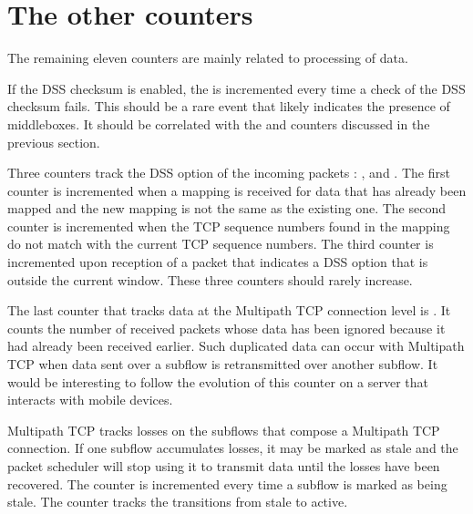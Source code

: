 \documentclass[letterpaper,10pt,english]{sphinxmanual}
\begin{document}
\section{The other counters}
\label{\detokenize{nstat-mptcp:the-other-counters}}
\sphinxAtStartPar
The remaining eleven counters are mainly related to processing of data.

\sphinxAtStartPar
If the DSS checksum is enabled, the  is incremented
every time a check of the DSS checksum fails. This should be a rare event that
likely indicates the presence of middleboxes. It should be correlated with
the  and  counters discussed in the
previous section.

\sphinxAtStartPar
Three counters track the DSS option of the incoming packets :
,  and
. The first counter is
incremented when a mapping is received for data that has already been mapped
and the new mapping is not the same as the existing one. The second counter
is incremented when the TCP sequence numbers found in the mapping do not
match with the current TCP sequence numbers. The third counter is incremented
upon reception of a packet that indicates a DSS option that is outside the
current window. These three counters should rarely increase.

\sphinxAtStartPar
The last counter that tracks data at the Multipath TCP connection
level is . It counts the number of received
packets whose data has been ignored because it had already been received
earlier. Such duplicated data can occur with Multipath TCP when data
sent over a subflow is retransmitted over another subflow. It would
be interesting to follow the evolution of this counter on a server that
interacts with mobile devices.

\sphinxAtStartPar
Multipath TCP tracks losses on the subflows that compose a Multipath
TCP connection. If one subflow accumulates losses, it may be marked
as stale and the packet scheduler will stop using it to transmit data
until the losses have been recovered. The  counter is
incremented every time a subflow is marked as being stale. The
 counter tracks the transitions from stale to
active.
\end{document}
